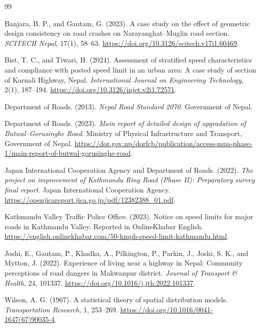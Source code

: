\documentclass[11pt,a4paper]{article}
\begin{document}
\begin{thebibliography}{99}

Banjara, B. P., and Gautam, G. (2023).
\newblock A case study on the effect of geometric design consistency on road
crashes on Narayanghat--Muglin road section.
\newblock \emph{SCITECH Nepal}, 17(1), 58--63.
\newblock \url{https://doi.org/10.3126/scitech.v17i1.60469}.

Bist, T. C., and Tiwari, H. (2024).
\newblock Assessment of stratified speed characteristics and compliance with
posted speed limit in an urban area: A case study of section of Karnali
Highway, Nepal.
\newblock \emph{International Journal on Engineering Technology}, 2(1),
187--194.
\newblock \url{https://doi.org/10.3126/injet.v2i1.72571}.

Department of Roads. (2013).
\newblock \emph{Nepal Road Standard 2070}.
\newblock Government of Nepal.

Department of Roads. (2023).
\newblock \emph{Main report of detailed design of upgradation of
Butwal--Gorusinghe Road}.
\newblock Ministry of Physical Infrastructure and Transport, Government of
Nepal.
\newblock \url{https://dor.gov.np/dorfcb/publication/access-mpa-phase-1/main-report-of-butwal-gorusinghe-road}.

Japan International Cooperation Agency and Department of Roads. (2022).
\newblock \emph{The project on improvement of Kathmandu Ring Road (Phase II):
Preparatory survey final report}.
\newblock Japan International Cooperation Agency.
\newblock \url{https://openjicareport.jica.go.jp/pdf/12382388_01.pdf}.

Kathmandu Valley Traffic Police Office. (2023).
\newblock Notice on speed limits for major roads in Kathmandu Valley.
\newblock Reported in OnlineKhabar English.
\newblock \url{https://english.onlinekhabar.com/50-kmph-speed-limit-kathmandu.html}.

Joshi, E., Gautam, P., Khadka, A., Pilkington, P., Parkin, J., Joshi, S. K.,
and Mytton, J. (2022).
\newblock Experience of living near a highway in Nepal: Community perceptions
of road dangers in Makwanpur district.
\newblock \emph{Journal of Transport \& Health}, 24, 101337.
\newblock \url{https://doi.org/10.1016/j.jth.2022.101337}.

Wilson, A. G. (1967).
\newblock A statistical theory of spatial distribution models.
\newblock \emph{Transportation Research}, 1, 253--269.
\newblock \url{https://doi.org/10.1016/0041-1647(67)90035-4}.


\end{thebibliography}
\end{document}
